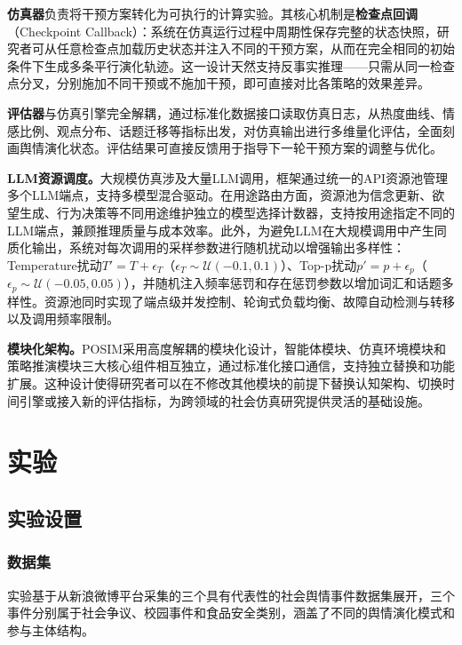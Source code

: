 \documentclass[a4paper,fleqn]{cas-sc}
\begin{document}
\textbf{仿真器}负责将干预方案转化为可执行的计算实验。其核心机制是\textbf{检查点回调}（Checkpoint Callback）：系统在仿真运行过程中周期性保存完整的状态快照，研究者可从任意检查点加载历史状态并注入不同的干预方案，从而在完全相同的初始条件下生成多条平行演化轨迹。这一设计天然支持反事实推理——只需从同一检查点分叉，分别施加不同干预或不施加干预，即可直接对比各策略的效果差异。

\textbf{评估器}与仿真引擎完全解耦，通过标准化数据接口读取仿真日志，从热度曲线、情感比例、观点分布、话题迁移等指标出发，对仿真输出进行多维量化评估，全面刻画舆情演化状态。评估结果可直接反馈用于指导下一轮干预方案的调整与优化。

\textbf{LLM资源调度。}大规模仿真涉及大量LLM调用，框架通过统一的API资源池管理多个LLM端点，支持多模型混合驱动。在用途路由方面，资源池为信念更新、欲望生成、行为决策等不同用途维护独立的模型选择计数器，支持按用途指定不同的LLM端点，兼顾推理质量与成本效率。此外，为避免LLM在大规模调用中产生同质化输出，系统对每次调用的采样参数进行随机扰动以增强输出多样性：Temperature扰动$T' = T + \epsilon_T$（$\epsilon_T \sim \mathcal{U}(-0.1, 0.1)$）、Top-p扰动$p' = p + \epsilon_p$（$\epsilon_p \sim \mathcal{U}(-0.05, 0.05)$），并随机注入频率惩罚和存在惩罚参数以增加词汇和话题多样性。资源池同时实现了端点级并发控制、轮询式负载均衡、故障自动检测与转移以及调用频率限制。

\textbf{模块化架构。}POSIM采用高度解耦的模块化设计，智能体模块、仿真环境模块和策略推演模块三大核心组件相互独立，通过标准化接口通信，支持独立替换和功能扩展。这种设计使得研究者可以在不修改其他模块的前提下替换认知架构、切换时间引擎或接入新的评估指标，为跨领域的社会仿真研究提供灵活的基础设施。

\section{实验}\label{sec:exp}

\subsection{实验设置}

\subsubsection{数据集}

实验基于从新浪微博平台采集的三个具有代表性的社会舆情事件数据集展开，三个事件分别属于社会争议、校园事件和食品安全类别，涵盖了不同的舆情演化模式和参与主体结构。
\end{document}
